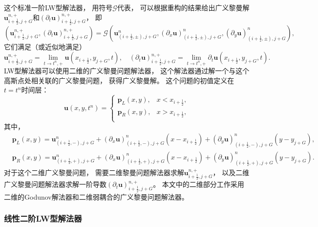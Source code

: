 这个标准一阶LW型解法器，
用符号$\mathcal{G}$代表，
可以根据重构的结果给出广义黎曼解${\bm{u}}_{i+\frac{1}{2},j+G}^{n, +}$和$\left({\partial_{t}}{\bm{u}}\right)_{i+\frac{1}{2},j+G}^{n, +}$，
即
\begin{equation}
  \label{eq:2D-solver}
  \left({\bm{u}}_{i+\frac{1}{2},j+G}^{n,+}, \left({\partial_{t}}{\bm{u}}\right)_{i+\frac{1}{2},j+G}^{n,+}\right) = \mathcal{G}\left({\bm{u}}_{(i+\frac{1}{2},\pm),j+G}^n, \left({\partial_{x}}{\bm{u}}\right)_{(i+\frac{1}{2},\pm),j+G}^n, \left({\partial_{y}}{\bm{u}}\right)_{(i+\frac{1}{2},\pm),j+G}^n\right),
\end{equation}
它们满足（或近似地满足）
\begin{equation}
  {\bm{u}}_{i+\frac{1}{2},j+G}^{n,+} = \lim_{t\to t^n,+} {\bm{u}}(x_{i+\frac{1}{2}},y_{j+G},t), \quad
  \left({\partial_{t}}{\bm{u}}\right)_{i+\frac{1}{2},j+G}^{n,+} = \lim_{t\to t^n,+} {\partial_{t}}{\bm{u}}(x_{i+\frac{1}{2}},y_{j+G},t).
\end{equation}
LW型解法器可以使用二维的广义黎曼问题解法器，
这个解法器通过解一个与这个高斯点处相关联的广义黎曼问题，
获得广义黎曼解。
这个问题的初值定义在$t=t^n$时间层：
\begin{equation}
  {\bm{u}}(x,y,t^n) = \begin{cases} {\bm{p}}_L(x,y), & x<x_{i+\frac{1}{2}}, \\ {\bm{p}}_R(x,y), & x>x_{i+\frac{1}{2}}, \\ \end{cases}
\end{equation}
其中，
\begin{align}
   & {\bm{p}}_L(x,y) ={\bm{u}}_{(i+\frac{1}{2},-),j+G}^n + \left({\partial_{x}}{\bm{u}}\right)_{(i+\frac{1}{2},-),j+G}^n (x-x_{i+\frac{1}{2}}) + \left({\partial_{y}}{\bm{u}}\right)_{(i+\frac{1}{2},-),j+G}^n (y-y_{j+G}),   \\
   & {\bm{p}}_R(x,y) = {\bm{u}}_{(i+\frac{1}{2},+),j+G}^n + \left({\partial_{x}}{\bm{u}}\right)_{(i+\frac{1}{2},+),j+G}^n (x-x_{i+\frac{1}{2}}) + \left({\partial_{y}}{\bm{u}}\right)_{(i+\frac{1}{2},+),j+G}^n (y-y_{j+G}).
\end{align}
对于这个二维广义黎曼问题，
需要二维黎曼问题解法器求解${\bm u}_{i+\frac{1}{2},j+G}^{n,+}$，
以及二维广义黎曼问题解法器求解一阶导数$\left({\partial_t}{\bm u}\right)_{i+\frac{1}{2},j+G}^{n,+}$。
本文中的二维部分工作采用二维的Godunov解法器和二维弱耦合的广义黎曼问题解法器。

\subsubsection{线性二阶LW型解法器}

